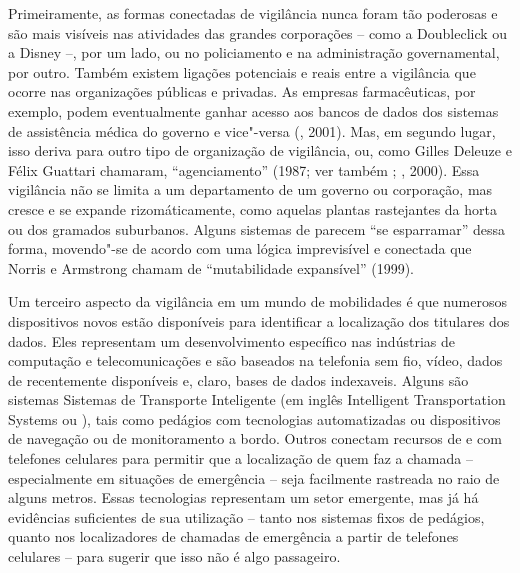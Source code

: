 Primeiramente, as formas conectadas de vigilância nunca foram tão
poderosas e são mais visíveis nas atividades das grandes corporações --
como a Doubleclick ou a Disney --, por um lado, ou no policiamento e na
administração governamental, por outro. Também existem ligações
potenciais e reais entre a vigilância que ocorre nas organizações
públicas e privadas. As empresas farmacêuticas, por exemplo, podem
eventualmente ganhar acesso aos bancos de dados dos sistemas de
assistência médica do governo e vice"-versa (, 2001). Mas, em
segundo lugar, isso deriva para outro tipo de organização de vigilância,
ou, como Gilles Deleuze e Félix Guattari chamaram, ``agenciamento''
(1987; ver também ; , 2000). Essa vigilância não se
limita a um departamento de um governo ou corporação, mas cresce e se
expande rizomáticamente, como aquelas plantas rastejantes da horta ou
dos gramados suburbanos. Alguns sistemas de  parecem ``se
esparramar'' dessa forma, movendo"-se de acordo com uma lógica
imprevisível e conectada que Norris e Armstrong chamam de ``mutabilidade
expansível'' (1999).

Um terceiro aspecto da vigilância em um mundo de mobilidades é que
numerosos dispositivos novos estão disponíveis para identificar a
localização dos titulares dos dados. Eles representam um desenvolvimento
específico nas indústrias de computação e telecomunicações e são
baseados na telefonia sem fio, vídeo, dados de  recentemente
disponíveis e, claro, bases de dados indexaveis. Alguns são sistemas
Sistemas de Transporte Inteligente (em inglês Intelligent Transportation
Systems ou ), tais como pedágios com tecnologias automatizadas ou
dispositivos de navegação ou de monitoramento a bordo. Outros conectam
recursos de  e  com telefones celulares para permitir que a
localização de quem faz a chamada -- especialmente em situações de
emergência -- seja facilmente rastreada no raio de alguns metros. Essas
tecnologias representam um setor emergente, mas já há evidências
suficientes de sua utilização -- tanto nos sistemas fixos de pedágios,
quanto nos localizadores de chamadas de emergência a partir de telefones
celulares -- para sugerir que isso não é algo passageiro.

